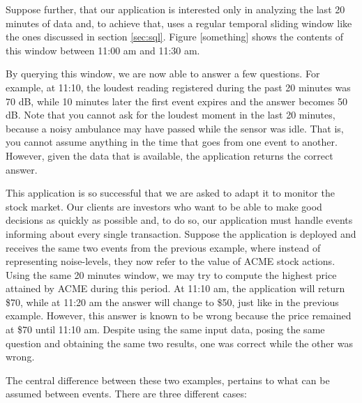 \documentclass{report}
\begin{document}
Suppose further, that our application is interested only in analyzing
the last 20 minutes of data and, to achieve that, uses a regular
temporal sliding window like the ones discussed in section
\ref{sec:sql}. Figure [something] shows the contents of this window
between 11:00 am and 11:30 am.

%

By querying this window, we are now able to answer a few
questions. For example, at 11:10, the loudest reading registered
during the past 20 minutes was 70 dB, while 10 minutes later the
first event expires and the answer becomes 50 dB. Note that you cannot
ask for the loudest moment in the last 20 minutes, because a noisy
ambulance may have passed while the sensor was idle. That is, you
cannot assume anything in the time that goes from one event to
another. However, given the data that is available, the application
returns the correct answer.

This application is so successful that we are asked to adapt it to
monitor the stock market. Our clients are investors who want to be
able to make good decisions as quickly as possible and, to do so, our
application must handle events informing about every single
transaction. Suppose the application is deployed and receives the same
two events from the previous example, where instead of representing
noise-levels, they now refer to the value of ACME stock actions. Using
the same 20 minutes window, we may try to compute the highest price
attained by ACME during this period. At 11:10 am, the application will
return \$70, while at 11:20 am the answer will change to \$50, just
like in the previous example. However, this answer is known to be
wrong because the price remained at \$70 until 11:10 am. Despite using
the same input data, posing the same question and obtaining the same
two results, one was correct while the other was wrong.

The central difference between these two examples, pertains to what
can be assumed between events. There are three different cases:
\end{document}

